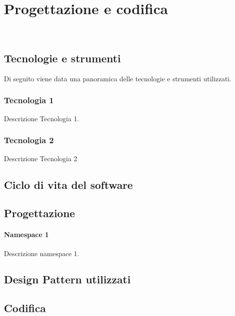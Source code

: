 \chapter{Progettazione e codifica}
\label{cap:implementazione-risultati}

\\

\section{Tecnologie e strumenti}
\label{sec:tecnologie-strumenti}

Di seguito viene data una panoramica delle tecnologie e strumenti utilizzati.

\subsection*{Tecnologia 1}
Descrizione Tecnologia 1.

\subsection*{Tecnologia 2}
Descrizione Tecnologia 2

\section{Ciclo di vita del software}
\label{sec:ciclo-vita-software}

\section{Progettazione}
\label{sec:progettazione}

\subsubsection{Namespace 1} %
Descrizione namespace 1.

\begin{namespacedesc}
\end{namespacedesc}


\section{Design Pattern utilizzati}

\section{Codifica}
